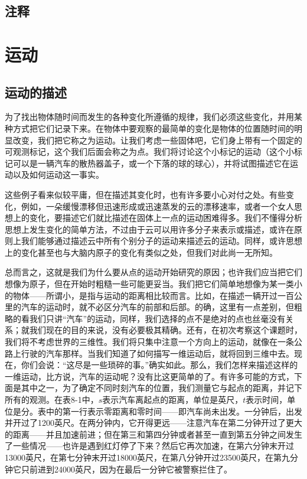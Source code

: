 \documentclass[12pt,oneside]{book}
\begin{document}
\begin{common-format}
\section{注释}
\showendnotes


\chapter{运动}
\section{运动的描述}
为了找出物体随时间而发生的各种变化所遵循的规律，我们必须这些变化，并用某种方式把它们记录下来。在物体中要观察的最简单的变化是物体的位置随时间的明显改变，我们把它称之为运动。让我们考虑一些固体吧，它们身上带有一个固定的可观测标记，这个我们后面会称之为点。我们将讨论这个小标记的运动（这个小标记可以是一辆汽车的散热器盖子，或一个下落的球的球心），并将试图描述它在运动以及如何运动这一事实。

这些例子看来似较平庸，但在描述其变化时，也有许多要小心对付之处。有些变化，例如，一朵缓慢漂移但迅速形成或迅速蒸发的云的漂移速率，或者一个女人思想上的变化，要描述它们就比描述在固体上一点的运动困难得多。我们不懂得分析思想上发生变化的简单方法，不过由于云可以用许多分子来表示或描述，或许在原则上我们能够通过描述云中所有个别分子的运动来描述云的运动。同样，或许思想上的变化甚至也与大脑内原子的变化有类似之处，但我们对此尚一无所知。

总而言之，这就是我们为什么要从点的运动开始研究的原因；也许我们应当把它们想像为原子，但在开始时粗糙一些可能更妥当。我们把它们简单地想像为某一类小的物体——所谓小，是指与运动的距离相比较而言。比如，在描述一辆开过一百公里的汽车的运动时，就不必区分汽车的前部和后部。的确，这里有一点差别，但粗略的看我们只讲“汽车”的运动，同样，我们选择的点不是绝对的点也丝毫没有关系；就我们现在的目的来说，没有必要极其精确。还有，在初次考察这个课题时，我们将不考虑世界的三维性。我们将只集中注意一个方向上的运动，就像在一条公路上行驶的汽车那样。当我们知道了如何描写一维运动后，就将回到三维中去。现在，你们会说：“这尽是一些琐碎的事。”确实如此。那么，我们怎样来描述这样的一维运动，比方说，汽车的运动呢？没有比这更简单的了。有许多可能的方式，下面是其中之一，为了确定不同时刻汽车的位置，我们测量它与起点的距离，并记下所有的观测。在表8-1中，$s$表示汽车离起点的距离，单位是英尺，$t$表示时间，单位是分。表中的第一行表示零距离和零时间——即汽车尚未出发。一分钟后，出发并开过了1200英尺。在两分钟内，它开得更远——注意汽车在第二分钟开过了更大的距离——并且加速前进；但在第三和第四分钟或者甚至一直到第五分钟之间发生了一些情况——也许是遇到红灯停了下来？然后它再次加速，在第六分钟末开过13000英尺，在第七分钟末开过18000英尺，在第八分钟开过23500英尺，在第九分钟它只前进到24000英尺，因为在最后一分钟它被警察拦住了。


\end{common-format}
\end{document}

